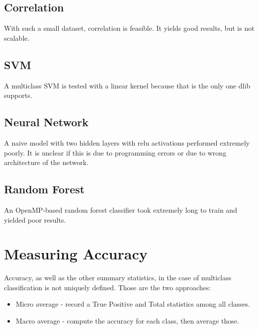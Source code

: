 \documentclass{article}
\begin{document}
\subsection{Correlation}
With such a small dataset, correlation is feasible.
It yields good results, but is not scalable.


\subsection{SVM}
A multiclass SVM is tested with a linear kernel because that is the only one dlib supports.



\subsection{Neural Network}
A naive model with two hidden layers with relu activations performed extremely poorly.
It is unclear if this is due to programming errors or due to wrong architecture of the network.


\subsection{Random Forest}
An OpenMP-based random forest classifier took extremely long to train and yielded poor results.


\section{Measuring Accuracy}
Accuracy, as well as the other summary statistics, in the case of multiclass classification is not uniquely defined.
Those are the two approaches:
\begin{itemize}
\item{Micro average - record a True Positive and Total statistics among all classes. }
\item{Macro average - compute the accuracy for each class, then average those.}
\end{itemize}
\end{document}
